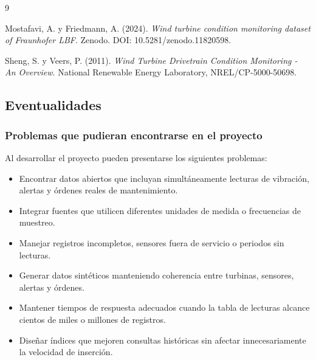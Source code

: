 \documentclass[11pt,a4paper]{article}
\begin{document}
\begingroup
\renewcommand{\section}[2]{}%
\begin{thebibliography}{9}

Mostafavi, A. y Friedmann, A. (2024).
\textit{Wind turbine condition monitoring dataset of Fraunhofer LBF}.
Zenodo. DOI: 10.5281/zenodo.11820598.

Sheng, S. y Veers, P. (2011).
\textit{Wind Turbine Drivetrain Condition Monitoring - An Overview}.
National Renewable Energy Laboratory, NREL/CP-5000-50698.

\end{thebibliography}
\endgroup

\subsection{Eventualidades}

\subsubsection{Problemas que pudieran encontrarse en el proyecto}

Al desarrollar el proyecto pueden presentarse los siguientes problemas:

\begin{itemize}
    \item Encontrar datos abiertos que incluyan simultáneamente lecturas de vibración,
    alertas y órdenes reales de mantenimiento.
    \item Integrar fuentes que utilicen diferentes unidades de medida o frecuencias de
    muestreo.
    \item Manejar registros incompletos, sensores fuera de servicio o periodos sin
    lecturas.
    \item Generar datos sintéticos manteniendo coherencia entre turbinas, sensores,
    alertas y órdenes.
    \item Mantener tiempos de respuesta adecuados cuando la tabla de lecturas alcance
    cientos de miles o millones de registros.
    \item Diseñar índices que mejoren consultas históricas sin afectar
    innecesariamente la velocidad de inserción.
\end{itemize}
\end{document}
